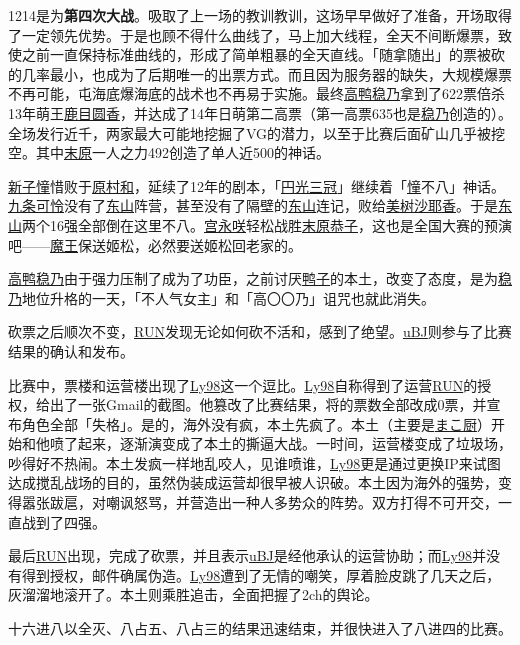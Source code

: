 1214是为\textbf{第四次大战}。吸取了上一场的教训教训，这场早早做好了准备，开场取得了一定领先优势。于是也顾不得什么曲线了，马上加大线程，全天不间断爆票，致使之前一直保持标准曲线的，形成了简单粗暴的全天直线。「随拿随出」的票被砍的几率最小，也成为了后期唯一的出票方式。而且因为服务器的缺失，大规模爆票不再可能，屯海底爆海底的战术也不再易于实施。最终\uline{高鸭稳乃}拿到了622票倍杀13年萌王\uline{鹿目圆香}，并达成了14年日萌第二高票（第一高票635也是\uline{稳乃}创造的）。全场发行近千，两家最大可能地挖掘了VG的潜力，以至于比赛后面矿山几乎被挖空。其中\uline{末原}一人之力492创造了单人近500的神话。

\uline{新子憧}惜败于\uline{原村和}，延续了12年的剧本，「\uline{円光三冠}」继续着「\uline{憧}不八」神话。\uline{九条可怜}没有了\uline{东山}阵营，甚至没有了隔壁的\uline{东山}连记，败给\uline{美树沙耶香}。于是\uline{东山}两个16强全部倒在这里不八。\uline{宫永咲}轻松战胜\uline{末原恭子}，这也是全国大赛的预演吧——\uline{魔王}保送{姬松}，必然要送姬松回老家的。

\uline{高鸭稳乃}由于强力压制了成为了功臣，之前讨厌\uline{鸭子}的本土，改变了态度，是为\uline{稳乃}地位升格的一天，「不人气女主」和「高〇〇乃」诅咒也就此消失。

砍票之后顺次不变，\uline{RUN}发现无论如何砍不活和，感到了绝望。\uline{uBJ}则参与了比赛结果的确认和发布。

比赛中，票楼和运营楼出现了\uline{Ly98}这一个逗比。\uline{Ly98}自称得到了运营\uline{RUN}的授权，给出了一张Gmail的截图。他篡改了比赛结果，将的票数全部改成0票，并宣布角色全部「失格」。是的，海外没有疯，本土先疯了。本土（主要是\uline{まこ厨}）开始和他喷了起来，逐渐演变成了本土的撕逼大战。一时间，运营楼变成了垃圾场，吵得好不热闹。本土发疯一样地乱咬人，见谁喷谁，\uline{Ly98}更是通过更换IP来试图达成搅乱战场的目的，虽然伪装成运营却很早被人识破。本土因为海外的强势，变得嚣张跋扈，对嘲讽怒骂，并营造出一种人多势众的阵势。双方打得不可开交，一直战到了四强。

最后\uline{RUN}出现，完成了砍票，并且表示\uline{uBJ}是经他承认的运营协助；而\uline{Ly98}并没有得到授权，邮件确属伪造。\uline{Ly98}遭到了无情的嘲笑，厚着脸皮跳了几天之后，灰溜溜地滚开了。本土则乘胜追击，全面把握了2ch的舆论。

十六进八以全灭、八占五、八占三的结果迅速结束，并很快进入了八进四的比赛。


